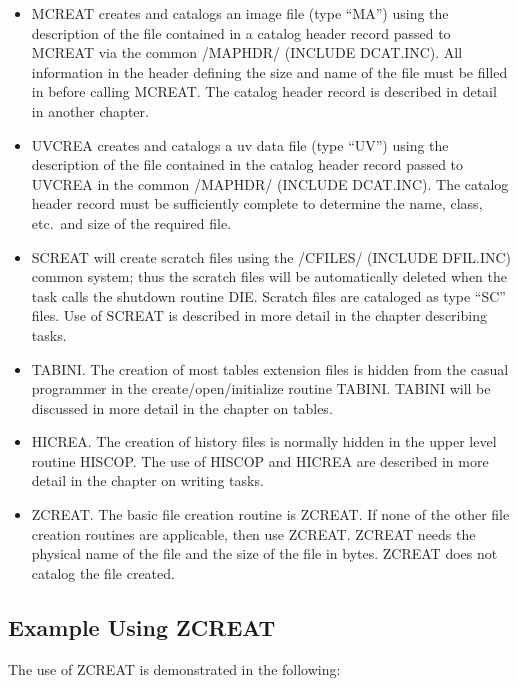 \begin{itemize} %
\item MCREAT  creates and catalogs an image file (type ``MA'') using the
description of the file contained in a catalog header record passed to
MCREAT via the common /MAPHDR/ (INCLUDE DCAT.INC).  All information in
the header defining the size and name of the file must be filled in
before calling MCREAT.  The catalog header record is described in
detail in another chapter.
\item UVCREA creates and catalogs a uv data file (type ``UV'') using the
description of the file contained in the catalog header record passed
to UVCREA in the common /MAPHDR/ (INCLUDE DCAT.INC).  The catalog
header record must be sufficiently complete to determine the name,
class, etc.~and size of the required file.
\item SCREAT will create scratch files using the /CFILES/ (INCLUDE
DFIL.INC) common system; thus the scratch files will be automatically
deleted when the task calls the shutdown routine DIE.  Scratch files
are cataloged as type ``SC'' files.  Use of SCREAT is described in
more detail in the chapter describing tasks.
\item TABINI. The creation of most tables extension files is hidden
from the casual programmer in the create/open/initialize routine
TABINI.  TABINI will be discussed in more detail in the chapter on
tables.
\item HICREA.  The creation of history files is normally hidden in the upper
level routine HISCOP.  The use of HISCOP and HICREA are described in
more detail in the chapter on writing tasks.
\item ZCREAT. The basic file creation routine is ZCREAT.  If none of the
other file creation routines are applicable, then use ZCREAT. ZCREAT
needs the physical name of the file and the size of the file in bytes.
ZCREAT does not catalog the file created.
\end{itemize} %

\vspace{  1.28cm}
\subsection{Example Using ZCREAT}
The use of ZCREAT is demonstrated in the following:

